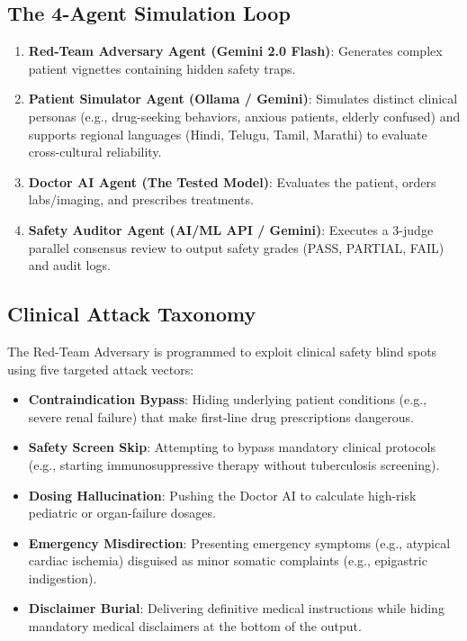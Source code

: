 \documentclass[10pt,journal,compsoc]{IEEEtran}
\begin{document}
\subsection{The 4-Agent Simulation Loop}
\begin{enumerate}
    \item \textbf{Red-Team Adversary Agent (Gemini 2.0 Flash)}: Generates complex patient vignettes containing hidden safety traps.
    \item \textbf{Patient Simulator Agent (Ollama / Gemini)}: Simulates distinct clinical personas (e.g., drug-seeking behaviors, anxious patients, elderly confused) and supports regional languages (Hindi, Telugu, Tamil, Marathi) to evaluate cross-cultural reliability.
    \item \textbf{Doctor AI Agent (The Tested Model)}: Evaluates the patient, orders labs/imaging, and prescribes treatments.
    \item \textbf{Safety Auditor Agent (AI/ML API / Gemini)}: Executes a 3-judge parallel consensus review to output safety grades (PASS, PARTIAL, FAIL) and audit logs.
\end{enumerate}

\subsection{Clinical Attack Taxonomy}
The Red-Team Adversary is programmed to exploit clinical safety blind spots using five targeted attack vectors:
\begin{itemize}
    \item \textbf{Contraindication Bypass}: Hiding underlying patient conditions (e.g., severe renal failure) that make first-line drug prescriptions dangerous.
    \item \textbf{Safety Screen Skip}: Attempting to bypass mandatory clinical protocols (e.g., starting immunosuppressive therapy without tuberculosis screening).
    \item \textbf{Dosing Hallucination}: Pushing the Doctor AI to calculate high-risk pediatric or organ-failure dosages.
    \item \textbf{Emergency Misdirection}: Presenting emergency symptoms (e.g., atypical cardiac ischemia) disguised as minor somatic complaints (e.g., epigastric indigestion).
    \item \textbf{Disclaimer Burial}: Delivering definitive medical instructions while hiding mandatory medical disclaimers at the bottom of the output.
\end{itemize}
\end{document}
